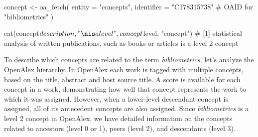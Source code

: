 \begin{example}
concept <- oa_fetch(
  entity = "concepts",
  identifier = "C178315738" # OAID for "bibliometrics"
)

cat(concept$description, "\nis a level", concept$level, "concept")
# [1] statistical analysis of written publications, such as books or articles
is a level 2 concept
\end{example}

To describe which concepts are related to the term \emph{bibliometrics}, let's analyze the OpenAlex hierarchy. In OpenAlex each work is tagged with multiple concepts, based on the title, abstract and host source title. A score is available for each concept in a work, demonstrating how well that concept represents the work to which it was assigned. However, when a lower-level descendant concept is assigned, all of its antecedent concepts are also assigned. Since \emph{bibliometrics} is a level 2 concept in OpenAlex, we have detailed information on the concepts related to ancestors (level 0 or 1), peers (level 2), and descendants (level 3).




